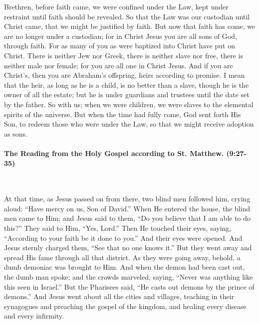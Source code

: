 \documentclass[twoside, letterpaper, 12pt]{report}
\begin{document}
\begin{maybetwocolumns}
  Brethren, before faith came, we were confined under the Law, kept under restraint until faith
  should be revealed. So that the Law was our custodian until Christ came, that we might be
  justified by faith. But now that faith has come, we are no longer under a custodian; for in Christ
  Jesus you are all sons of God, through faith. For as many of you as were baptized into Christ have
  put on Christ. There is neither Jew nor Greek, there is neither slave nor free, there is neither
  male nor female; for you are all one in Christ Jesus. And if you are Christ’s, then you are
  Abraham’s offspring, heirs according to promise. I mean that the heir, as long as he is a child,
  is no better than a slave, though he is the owner of all the estate; but he is under guardians and
  trustees until the date set by the father. So with us; when we were children, we were slaves to
  the elemental spirits of the universe. But when the time had fully come, God sent forth His Son,
  to redeem those who were under the Law, so that we might receive adoption as sons.
\end{maybetwocolumns}



\paragraph{The Reading from the Holy Gospel according to St. Matthew. (9:27-35)}\mbox{}\\

\begin{maybetwocolumns}
  At that time, as Jesus passed on from there, two blind men followed him, crying aloud:
  “Have mercy on us, Son of David.” When He entered the house, the blind men came to Him; and
  Jesus said to them, “Do you believe that I am able to do this?” They said to Him, “Yes, Lord.”
  Then He touched their eyes, saying, “According to your faith be it done to you.” And their eyes
  were opened. And Jesus sternly charged them, “See that no one knows it.” But they went away
  and spread His fame through all that district. As they were going away, behold, a dumb demoniac
  was brought to Him. And when the demon had been cast out, the dumb man spoke; and the crowds
  marveled, saying, “Never was anything like this seen in Israel.” But the Pharisees said, “He casts
  out demons by the prince of demons.” And Jesus went about all the cities and villages, teaching in
  their synagogues and preaching the gospel of the kingdom, and healing every disease and every
  infirmity.
\end{maybetwocolumns}
\end{document}
